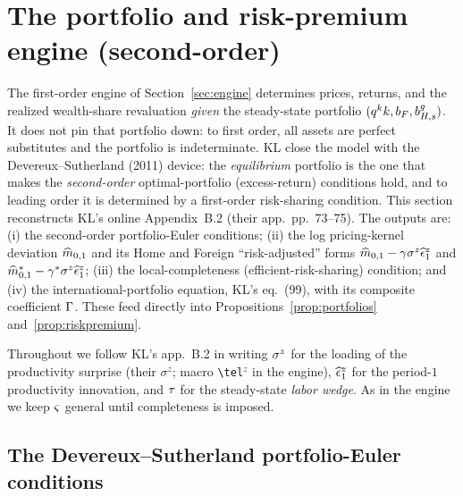 \section{The portfolio and risk-premium engine (second-order)}
\label{sec:portfolio-engine}

The first-order engine of Section~\ref{sec:engine} determines prices, returns,
and the realized wealth-share revaluation \emph{given} the steady-state
portfolio $(q^{k} k,b_F,b^g_{H,s})$. It does not pin that portfolio down: to first
order, all assets are perfect substitutes and the portfolio is indeterminate.
KL close the model with the Devereux--Sutherland (2011) device: the
\emph{equilibrium} portfolio is the one that makes the \emph{second-order}
optimal-portfolio (excess-return) conditions hold, and to leading order it is
determined by a first-order risk-sharing condition. This section reconstructs
KL's online Appendix~B.2 (their app.~pp.~73--75). The outputs are: (i) the
second-order portfolio-Euler conditions; (ii) the log pricing-kernel deviation
$\widehat{m}_{0,1}$ and its Home and Foreign ``risk-adjusted'' forms
$\widehat{m}_{0,1}-\gamma\sigma^z\widehat{\epsilon}^z_1$ and
$\widehat{m}^{*}_{0,1}-\gamma^{*}\sigma^z\widehat{\epsilon}^z_1$; (iii) the
local-completeness (efficient-risk-sharing) condition; and (iv) the
international-portfolio equation, KL's eq.~(99), with its composite coefficient
$\Gamma$. These feed directly into Propositions~\ref{prop:portfolios}
and~\ref{prop:riskpremium}.

Throughout we follow KL's app.~B.2 in writing $\sigma^z$ for the loading of the
productivity surprise (their $\sigma^z$; macro \texttt{\textbackslash tel}$^z$ in
the engine), $\widehat{\epsilon}^z_1$ for the period-$1$ productivity innovation, and
$\tau$ for the steady-state \emph{labor wedge}. As in the engine we keep
$\varsigma$ general until completeness is imposed.

\subsection{The Devereux--Sutherland portfolio-Euler conditions}
\label{sec:portfolio-euler}

